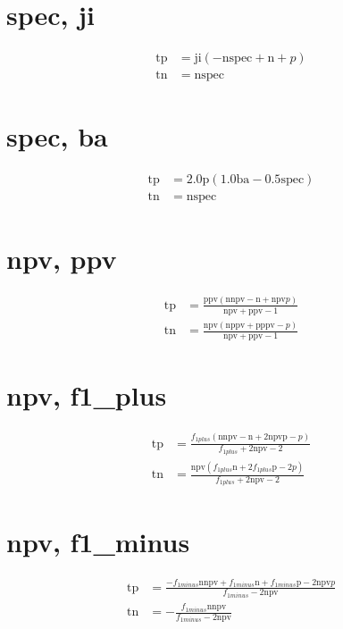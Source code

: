 \documentclass[3p,times]{elsarticle}
\begin{document}
\begin{footnotesize}
\begin{landscape}
\section{spec, ji}
\begin{align}
\mathrm{tp} &= \mathrm{ji} \left(- \mathrm{n} \mathrm{spec} + \mathrm{n} + p\right)\\
\mathrm{tn} &= \mathrm{n} \mathrm{spec}
\end{align}
\section{spec, ba}
\begin{align}
\mathrm{tp} &= 2.0 \mathrm{p} \left(1.0 \mathrm{ba} - 0.5 \mathrm{spec}\right)\\
\mathrm{tn} &= \mathrm{n} \mathrm{spec}
\end{align}
\section{npv, ppv}
\begin{align}
\mathrm{tp} &= \frac{\mathrm{ppv} \left(\mathrm{n} \mathrm{npv} - \mathrm{n} + \mathrm{npv} p\right)}{\mathrm{npv} + \mathrm{ppv} - 1}\\
\mathrm{tn} &= \frac{\mathrm{npv} \left(\mathrm{n} \mathrm{ppv} + \mathrm{p} \mathrm{ppv} - p\right)}{\mathrm{npv} + \mathrm{ppv} - 1}
\end{align}
\section{npv, f1_plus}
\begin{align}
\mathrm{tp} &= \frac{f_{1 plus} \left(\mathrm{n} \mathrm{npv} - \mathrm{n} + 2 \mathrm{npv} \mathrm{p} - p\right)}{f_{1 plus} + 2 \mathrm{npv} - 2}\\
\mathrm{tn} &= \frac{\mathrm{npv} \left(f_{1 plus} \mathrm{n} + 2 f_{1 plus} \mathrm{p} - 2 p\right)}{f_{1 plus} + 2 \mathrm{npv} - 2}
\end{align}
\section{npv, f1_minus}
\begin{align}
\mathrm{tp} &= \frac{- f_{1 minus} \mathrm{n} \mathrm{npv} + f_{1 minus} \mathrm{n} + f_{1 minus} \mathrm{p} - 2 \mathrm{npv} p}{f_{1 minus} - 2 \mathrm{npv}}\\
\mathrm{tn} &= - \frac{f_{1 minus} \mathrm{n} \mathrm{npv}}{f_{1 minus} - 2 \mathrm{npv}}
\end{align}

\end{landscape}
\end{footnotesize}
\end{document}
